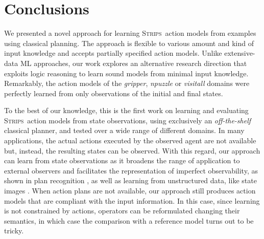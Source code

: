 \documentclass[3p,times]{elsarticle}
\newcommand{\strips}{\textsc{Strips}}     %
\begin{document}














\section{Conclusions}
\label{sec:conclusions}
We presented a novel approach for learning \strips\ action models from examples using classical planning. The approach is flexible to various amount and kind of input knowledge and accepts partially specified action models. Unlike extensive-data ML approaches, our work explores an alternative research direction that exploits logic reasoning to learn sound models from minimal input knowledge. Remarkably, the action models of the {\em gripper}, {\em npuzzle} or {\em visitall} domains were perfectly learned from only observations of the initial and final states.

To the best of our knowledge, this is the first work on learning and evaluating \strips\ action models from state observations, using exclusively an {\em off-the-shelf} classical planner, and tested over a wide range of different domains.  In many applications, the actual actions executed by the observed agent are not available but, instead, the resulting states can be observed. With this regard, our approach can learn from state observations as it broadens the range of application to external observers and facilitates the representation of imperfect observability, as shown in plan recognition \cite{SohrabiRU16}, as well as learning from unstructured data, like state images \cite{AsaiF18}. When action plans are not available, our approach still produces action models that are compliant with the input information. In this case, since learning is not constrained by actions, operators can be reformulated changing their semantics, in which case the comparison with a reference model turns out to be tricky.
\end{document}
